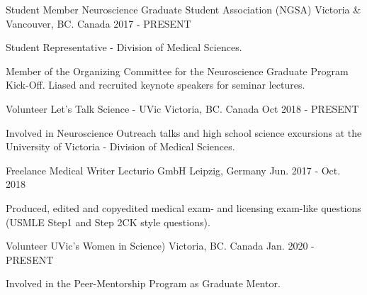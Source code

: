 \begin{cventries}
  \cventry
    {Student Member} %
    {Neuroscience Graduate Student Association (NGSA)} %
    {Victoria \& Vancouver, BC. Canada} %
    {2017 - PRESENT} %
    {
      \begin{cvitems} %
        \item {Student Representative - Division of Medical Sciences.}
        \item {Member of the Organizing Committee for the Neuroscience Graduate Program Kick-Off. Liased and recruited keynote speakers for seminar lectures.}
      \end{cvitems}
    }
    \cventry
    {Volunteer} %
    {Let's Talk Science - UVic} %
    {Victoria, BC. Canada} %
    {Oct 2018 - PRESENT} %
    {
    \begin{cvitems} %
    \item {Involved in Neuroscience Outreach talks and high school science excursions at the University of Victoria - Division of Medical Sciences.}
    \end{cvitems}
    }
\vspace{10pt}
    \cventry
    {Freelance Medical Writer} %
    {Lecturio GmbH} %
    {Leipzig, Germany} %
    {Jun. 2017 - Oct. 2018} %
    {
    \begin{cvitems} %
      \item {Produced, edited and copyedited medical exam- and licensing exam-like questions (USMLE Step1 and Step 2CK style questions).}
    \end{cvitems}
    } 
\vspace{5pt} 
  \cventry
    {Volunteer} %
    {UVic's Women in Science)} %
    {Victoria, BC. Canada} %
    {Jan. 2020 - PRESENT} %
    {
      \begin{cvitems} %
        \item {Involved in the Peer-Mentorship Program as Graduate Mentor.}
      \end{cvitems}
    }


\end{cventries}
